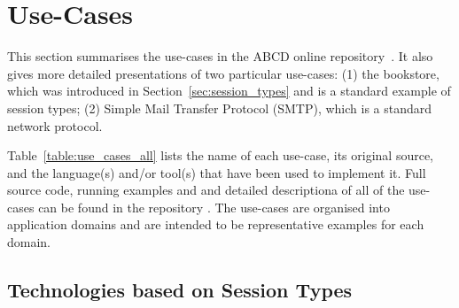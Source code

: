 
\section{Use-Cases}
\label{sec:usecases}

This section summarises the use-cases in
the ABCD online repository~\cite{usecase_repository}. It also gives more detailed presentations of two particular use-cases: (1) the bookstore, which was introduced in Section~\ref{sec:session_types} and is a standard example of session types; (2) Simple Mail Transfer Protocol (SMTP), which is a standard network protocol.



Table~\ref{table:use_cases_all} lists the name of each use-case, its original source, and the language(s) and/or tool(s) that have been used to implement it. Full source code,
running examples and and detailed descriptiona of all of the use-cases can be found in the repository \cite{usecase_repository}.
The use-cases are organised into application domains and are intended to be representative examples for each domain.

\subsection{Technologies based on Session Types}


